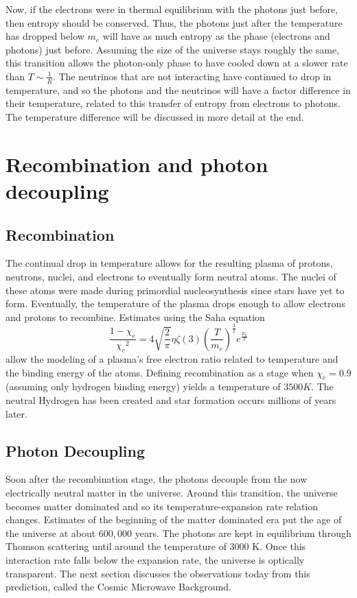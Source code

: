 \documentclass[12pt]{article}
\theoremstyle{plain}
\theoremstyle{definition}
\begin{document}
\hspace{0.2in} Now, if the electrons were in thermal equilibrium with the photons just before, then entropy should be conserved. Thus, the photons just after the temperature has dropped below $m_e$ will have as much entropy as the phase (electrons and photons) just before. Assuming the size of the universe stays roughly the same, this transition allows the photon-only phase to have cooled down at a slower rate than $T\sim\frac{1}{R}$. The neutrinos that are not interacting have continued to drop in temperature, and so the photons and the neutrinos will have a factor difference in their temperature, related to this transfer of entropy from electrons to photons. The temperature difference will be discussed in more detail at the end. 
\section{Recombination and photon decoupling}
\subsection{Recombination}
\hspace{0.2in} The continual drop in temperature allows for the resulting plasma of protons, neutrons, nuclei, and electrons to eventually form neutral atoms. The nuclei of these atoms were made during primordial nucleosynthesis since stars have yet to form. Eventually, the temperature of the plasma drops enough to allow electrons and protons to recombine. Estimates using the Saha equation \cite{Kolb:1990vq}
\begin{equation}
\frac{1-\chi_e}{{\chi_e}^2}=4\sqrt{\frac{2}{\pi}}\eta\zeta(3)(\frac{T}{m_e})^{\frac{3}{2}}e^{\frac{E_b}{T}}
\end{equation}
allow the modeling of a plasma's free electron ratio related to temperature and the binding energy of the atoms. Defining recombination as a stage when $\chi_{e}=0.9$ (assuming only hydrogen binding energy) yields a temperature of $3500K$. The neutral Hydrogen has been created and star formation occurs millions of years later. 
\subsection{Photon Decoupling}
\hspace{0.2in}Soon after the recombination stage, the photons decouple from the now electrically neutral matter in the universe. Around this transition, the universe becomes matter dominated and so its temperature-expansion rate relation changes. Estimates of the beginning of the matter dominated era put the age of the universe at about $600,000$ years. The photons are kept in equilibrium through Thomson scattering until around the temperature of $3000$ K. Once this interaction rate falls below the expansion rate, the universe is optically transparent. The next section discusses the observations today from this prediction, called the Cosmic Microwave Background. 
\end{document}
